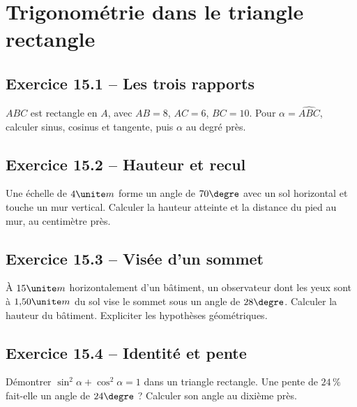 \chapter{Trigonométrie dans le triangle rectangle}
\label{exercices:15}
\section*{Exercice 15.1 -- Les trois rapports}
$ABC$ est rectangle en $A$, avec $AB=8$, $AC=6$, $BC=10$. Pour $\alpha=\widehat{ABC}$, calculer sinus, cosinus et tangente, puis $\alpha$ au degré près.

\section*{Exercice 15.2 -- Hauteur et recul}
Une échelle de $4\unite m$ forme un angle de $70\degre$ avec un sol horizontal et touche un mur vertical. Calculer la hauteur atteinte et la distance du pied au mur, au centimètre près.

\section*{Exercice 15.3 -- Visée d'un sommet}
À $15\unite m$ horizontalement d'un bâtiment, un observateur dont les yeux sont à $1{,}50\unite m$ du sol vise le sommet sous un angle de $28\degre$. Calculer la hauteur du bâtiment. Expliciter les hypothèses géométriques.

\section*{Exercice 15.4 -- Identité et pente}
Démontrer $\sin^2\alpha+\cos^2\alpha=1$ dans un triangle rectangle. Une pente de $24\,\%$ fait-elle un angle de $24\degre$ ? Calculer son angle au dixième près.
